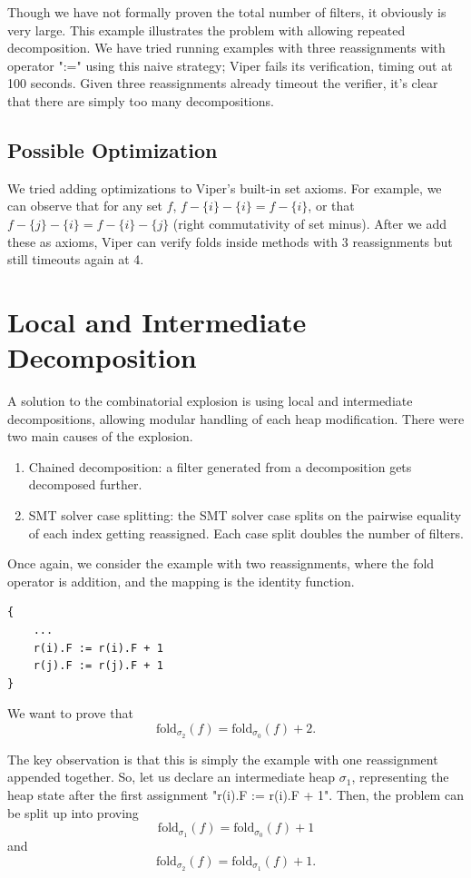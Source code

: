 \documentclass[msc,oneside]{ubcthesis}
\begin{document}
Though we have not formally proven the total number of filters, it obviously is very large. This example illustrates the problem with allowing repeated decomposition. We have tried running examples with three reassignments with operator ":=" using this naive strategy; Viper fails its verification, timing out at 100 seconds. Given three reassignments already timeout the verifier, it's clear that there are simply too many decompositions.

\subsection{Possible Optimization}
We tried adding optimizations to Viper's built-in set axioms. For example, we can observe that for any set $f$, $f - \{i\} - \{i\} = f - \{i\}$, or that $f - \{j\} - \{i\} = f - \{i\} - \{j\}$ (right commutativity of set minus). After we add these as axioms, Viper can verify folds inside methods with 3 reassignments but still timeouts again at 4.

\section{Local and Intermediate Decomposition}
A solution to the combinatorial explosion is using local and intermediate decompositions, allowing modular handling of each heap modification. There were two main causes of the explosion.
\begin{enumerate}
    \item Chained decomposition: a filter generated from a decomposition gets decomposed further.
    \item SMT solver case splitting: the SMT solver case splits on the pairwise equality of each index getting reassigned. Each case split doubles the number of filters.
\end{enumerate}

Once again, we consider the example with two reassignments, where the fold operator is addition, and the mapping is the identity function. 
\begin{lstlisting}
{
    ...
    r(i).F := r(i).F + 1 
    r(j).F := r(j).F + 1 
}
\end{lstlisting}
We want to prove that $$\textrm{fold}_{\sigma_2}(f) = \textrm{fold}_{\sigma_0}(f) + 2.$$

The key observation is that this is simply the example with one reassignment appended together. So, let us declare an intermediate heap $\sigma_1$, representing the heap state after the first assignment "r(i).F := r(i).F + 1". Then, the problem can be split up into proving 
$$\textrm{fold}_{\sigma_1}(f) = \textrm{fold}_{\sigma_0}(f) + 1 $$ and $$\textrm{fold}_{\sigma_2}(f) = \textrm{fold}_{\sigma_1}(f) + 1. $$ 
\end{document}
